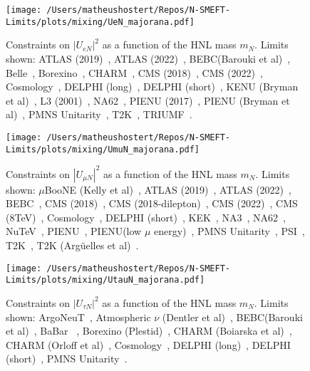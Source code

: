 \documentclass{revtex4-1}%
\begin{document}
%
\normalsize%


\begin{figure}[h!]%
\centering%
\texttt{[image: /Users/matheushostert/Repos/N-SMEFT-Limits/plots/mixing/UeN\_majorana.pdf]}%
\caption{Constraints on $|U_{e N}|^2$ as a function of the HNL mass $m_N$. Limits shown: ATLAS (2019)~\cite{ATLAS:2019kpx}, ATLAS (2022)~\cite{ATLAS:2022atq}, BEBC(Barouki et al)~\cite{Barouki:2022bkt}, Belle~\cite{Belle:2013ytx}, Borexino~\cite{Borexino:2013bot}, CHARM~\cite{CHARM:1985nku}, CMS (2018)~\cite{CMS:2018iaf}, CMS (2022)~\cite{CMS:2022fut}, Cosmology~\cite{Sabti:2020yrt}, DELPHI (long)~\cite{DELPHI:1996qcc}, DELPHI (short)~\cite{DELPHI:1996qcc}, KENU (Bryman et al)~\cite{Bryman:2019bjg}, L3 (2001)~\cite{L3:2001zfe}, NA62~\cite{NA62:2020mcv}, PIENU (2017)~\cite{PIENU:2017wbj}, PIENU (Bryman et al)~\cite{Bryman:2019bjg}, PMNS Unitarity~\cite{Workinprogress}, T2K~\cite{T2K:2019jwa}, TRIUMF~\cite{Britton:1992xv}.}%
\end{figure}

%


\begin{figure}[h!]%
\centering%
\texttt{[image: /Users/matheushostert/Repos/N-SMEFT-Limits/plots/mixing/UmuN\_majorana.pdf]}%
\caption{Constraints on $|U_{\mu N}|^2$ as a function of the HNL mass $m_N$. Limits shown: $\mu$BooNE (Kelly et al)~\cite{Kelly:2021xbv}, ATLAS (2019)~\cite{ATLAS:2019kpx}, ATLAS (2022)~\cite{ATLAS:2022atq}, BEBC~\cite{WA66:1985mfx}, CMS (2018)~\cite{CMS:2018iaf}, CMS (2018-dilepton)~\cite{CMS:2018jxx}, CMS (2022)~\cite{CMS:2022fut}, CMS (8TeV)~\cite{CMS:2016aro}, Cosmology~\cite{Sabti:2020yrt}, DELPHI (short)~\cite{DELPHI:1996qcc}, KEK~\cite{Bryman:2019bjg}, NA3~\cite{NA3:1986ahv}, NA62~\cite{NA62:2021bji}, NuTeV~\cite{NuTeV:1999kej}, PIENU~\cite{PIENU:2019usb}, PIENU(low $\mu$ energy)~\cite{PIENU:2019usb}, PMNS Unitarity~\cite{Workinprogress}, PSI~\cite{Daum:1987bg}, T2K~\cite{T2K:2019jwa}, T2K (Arg\"uelles et al)~\cite{Arguelles:2021dqn}.}%
\end{figure}

%


\begin{figure}[h!]%
\centering%
\texttt{[image: /Users/matheushostert/Repos/N-SMEFT-Limits/plots/mixing/UtauN\_majorana.pdf]}%
\caption{Constraints on $|U_{\tau N}|^2$ as a function of the HNL mass $m_N$. Limits shown: ArgoNeuT~\cite{ArgoNeuT:2021clc}, Atmospheric $\nu$ (Dentler et al)~\cite{Dentler:2018sju}, BEBC(Barouki et al)~\cite{Barouki:2022bkt}, BaBar ~\cite{BaBar:2022cqj}, Borexino (Plestid)~\cite{Plestid:2020ssy}, CHARM (Boiarska et al)~\cite{Boiarska:2021yho}, CHARM (Orloff et al)~\cite{Orloff:2002de}, Cosmology~\cite{Sabti:2020yrt}, DELPHI (long)~\cite{DELPHI:1996qcc}, DELPHI (short)~\cite{DELPHI:1996qcc}, PMNS Unitarity~\cite{Workinprogress}.}%
\end{figure}

%
%
%
\end{document}
